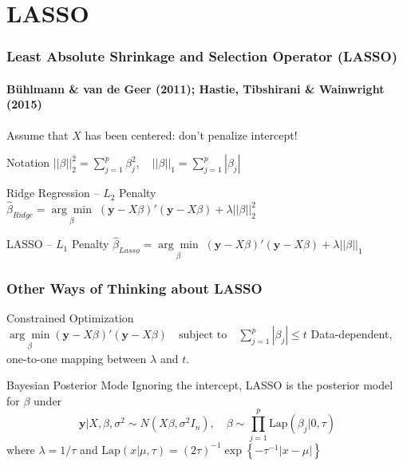 \section{LASSO}
\begin{frame}
  \frametitle{Least Absolute Shrinkage and Selection Operator (LASSO)}
  \framesubtitle{B\"{u}hlmann \& van de Geer (2011); Hastie, Tibshirani \& Wainwright (2015)}

  Assume that $X$ has been centered: don't penalize intercept!

  \begin{block}{Notation}
    $\left| \left| \beta\right| \right|_2^2 = \sum_{j=1}^p \beta_j^2, \quad \left| \left| \beta\right| \right|_1 = \sum_{j=1}^p |\beta_j|$
  \end{block}

  \begin{block}{Ridge Regression -- $L_2$ Penalty}
	$\widehat{\beta}_{Ridge} =\underset{\beta}{\arg \min}\; (\mathbf{y} -  X\beta)' (\mathbf{y} - X\beta) + \lambda \left| \left| \beta\right| \right|_2^2$
  \end{block}

  \begin{block}{LASSO -- $L_1$ Penalty}
	$\widehat{\beta}_{Lasso} =\underset{\beta}{\arg \min}\; (\mathbf{y} - X\beta)' (\mathbf{y} - X\beta) + \lambda \left| \left| \beta\right| \right|_1$
  \end{block}

  
\end{frame}
\begin{frame}
  \frametitle{Other Ways of Thinking about LASSO}
  \begin{block}{Constrained Optimization}
	$\underset{\beta}{\arg \min} (\mathbf{y}  - X\beta)' (\mathbf{y} - X\beta) \quad \mbox{subject to}\quad \sum_{j=1}^p |\beta_j| \leq t$
Data-dependent, one-to-one mapping between $\lambda$ and $t$.
\end{block}

\begin{block}{Bayesian Posterior Mode}
    Ignoring the intercept, LASSO is the posterior model for $\beta$ under
		\[\mathbf{y}|X,\beta, \sigma^2 \sim N(X\beta,\sigma^2 I_n), \quad
    \beta\sim \prod_{j=1}^p \mbox{Lap}(\beta_j|0, \tau)\]
  where  
  $\lambda= 1/\tau$ and 
  $\mbox{Lap}(x|\mu,\tau)= (2\tau)^{-1}\exp\left \{-\tau^{-1}|x-\mu| \right\}$
\end{block}
\end{frame}
